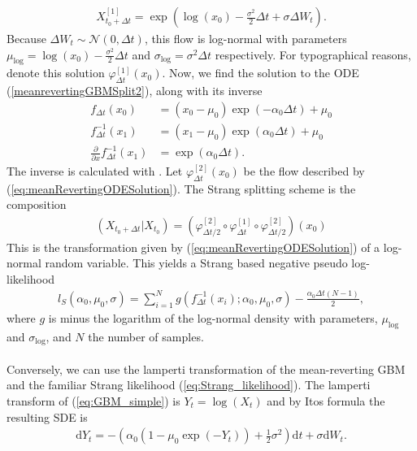 \begin{align}
    X_{t_0 + \Delta t}^{[1]} = \exp\left(\log(x_0) -\frac{\sigma^2}{2}\Delta t + \sigma \Delta W_t\right).
\end{align}
Because $\Delta W_t\sim\mathcal{N}(0,\Delta t)$, this flow is log-normal with parameters $\mu_{\mathrm{log}} = \log(x_0) -\frac{\sigma^2}{2}\Delta t$ and $\sigma_{\log} = \sigma^2\Delta t$ respectively. For typographical reasons, denote this solution $\varphi_{\Delta t}^{[1]}(x_0)$. Now, we find the solution to the ODE (\ref{meanrevertingGBMSplit2}), along with its inverse 
\begin{align}
    f_{\Delta t}(x_0) &= (x_0 - \mu_0)\exp(-\alpha_0\Delta t) + \mu_0 \label{eq:meanRevertingODESolution}\\
    f_{\Delta t}^{-1}(x_1) &=  (x_1 - \mu_0)\exp(\alpha_0\Delta t) + \mu_0\\
    \frac{\partial}{\partial x} f_{\Delta t}^{-1}(x_1) &= \exp\left(\alpha_0\Delta t\right).
\end{align}
The inverse is calculated with \cite[remark belown equation (9)]{SplittingSchemes}. Let $\varphi_{\Delta t}^{[2]}(x_0)$ be the flow described by (\ref{eq:meanRevertingODESolution}).
The Strang splitting scheme is the composition
\begin{align}
    \left(X_{t_0 + \Delta t} | X_{t_0}\right) = \left(\varphi_{\Delta t / 2}^{[2]}\circ \varphi_{\Delta t}^{[1]} \circ \varphi_{\Delta t / 2}^{[2]}\right)(x_0)
\end{align}
This is the transformation given by (\ref{eq:meanRevertingODESolution}) of a log-normal random variable. This yields a Strang based negative pseudo log-likelihood
\begin{align}
    l_S(\alpha_0, \mu_0, \sigma) = \sum_{i = 1}^{N} g(f_{\Delta t}^{-1}(x_i); \alpha_0,\mu_0, \sigma) - \frac{\alpha_0\Delta t(N - 1)}{2},
\end{align}
where $g$ is minus the logarithm of the log-normal density with parameters, $\mu_{\mathrm{log}}$ and $\sigma_{\mathrm{log}}$, and $N$ the number of samples.\\\\
Conversely, we can use the lamperti transformation of the mean-reverting GBM and the familiar Strang likelihood (\ref{eq:Strang_likelihood}). The lamperti transform of (\ref{eq:GBM_simple}) is $Y_t = \log(X_t)$ and by Itos formula the resulting SDE is
\begin{align}
    \mathrm{d}Y_t = -\left(\alpha_0\left(1 - \mu_0\exp(-Y_t)\right) + \frac{1}{2}\sigma^2\right)\mathrm{d}t + \sigma \mathrm{d}W_t. \label{eq:GBM_lamperti}
\end{align}
